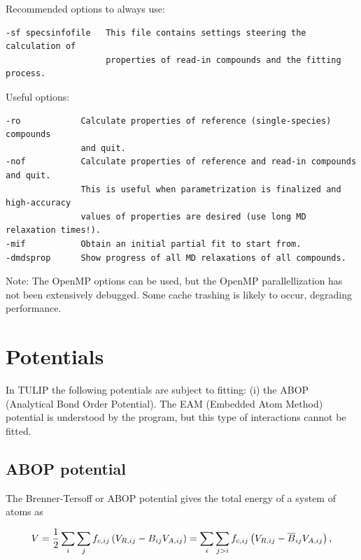 \documentclass[a4paper,12pt,pdftex,onecolumn]{article}
\begin{document}
Recommended options to always use:

\begin{Verbatim}[fontsize=\relsize{-1},frame=single]
-sf specsinfofile   This file contains settings steering the calculation of
                    properties of read-in compounds and the fitting process.
\end{Verbatim}

Useful options:

\begin{Verbatim}[fontsize=\relsize{-1},frame=single]
-ro            Calculate properties of reference (single-species) compounds
               and quit.
-nof           Calculate properties of reference and read-in compounds and quit.
               This is useful when parametrization is finalized and high-accuracy
               values of properties are desired (use long MD relaxation times!).
-mif           Obtain an initial partial fit to start from.
-dmdsprop      Show progress of all MD relaxations of all compounds.
\end{Verbatim}

Note: The OpenMP options can be used, but the OpenMP parallellization has not been
extensively debugged. Some cache trashing is likely to occur, degrading performance.






\section{Potentials}

In \textsc{TULIP} the following potentials are subject to fitting:
(i)  the ABOP (Analytical Bond Order Potential).
The EAM (Embedded Atom Method) potential is understood by the
program, but this type of interactions cannot be fitted.






\subsection{ABOP potential}

The Brenner-Tersoff or ABOP potential gives the total energy of a system of atoms as

\begin{equation}
V = {1 \over 2} \sum_i \sum_{j} f_{c,ij} \left( V_{R,ij} - B_{ij} V_{A,ij} \right)
= \sum_i \sum_{j>i} f_{c,ij} \left( V_{R,ij} - \overline{B}_{ij} V_{A,ij} \right),
\label{eq:abop}
\end{equation}
\end{document}
